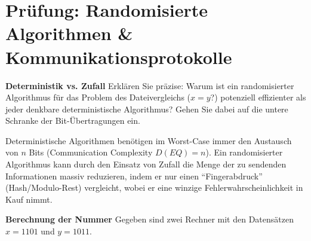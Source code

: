 \section*{Prüfung: Randomisierte Algorithmen \& Kommunikationsprotokolle}

\begin{questions}

\question \textbf{Deterministik vs. Zufall}
Erklären Sie präzise: Warum ist ein randomisierter Algorithmus für das Problem des Dateivergleichs ($x=y$?) potenziell effizienter als jeder denkbare deterministische Algorithmus? Gehen Sie dabei auf die untere Schranke der Bit-Übertragungen ein.
\begin{solution}
	Deterministische Algorithmen benötigen im Worst-Case immer den Austausch von $n$ Bits (Communication Complexity $D(EQ)=n$). Ein randomisierter Algorithmus kann durch den Einsatz von Zufall die Menge der zu sendenden Informationen massiv reduzieren, indem er nur einen \enquote{Fingerabdruck} (Hash/Modulo-Rest) vergleicht, wobei er eine winzige Fehlerwahrscheinlichkeit in Kauf nimmt.
\end{solution}
\droptotalpoints

\question \textbf{Berechnung der Nummer}
Gegeben sind zwei Rechner mit den Datensätzen $x = 1101$ und $y = 1011$.
\begin{solution}
\end{solution}
\droptotalpoints


\end{questions}
